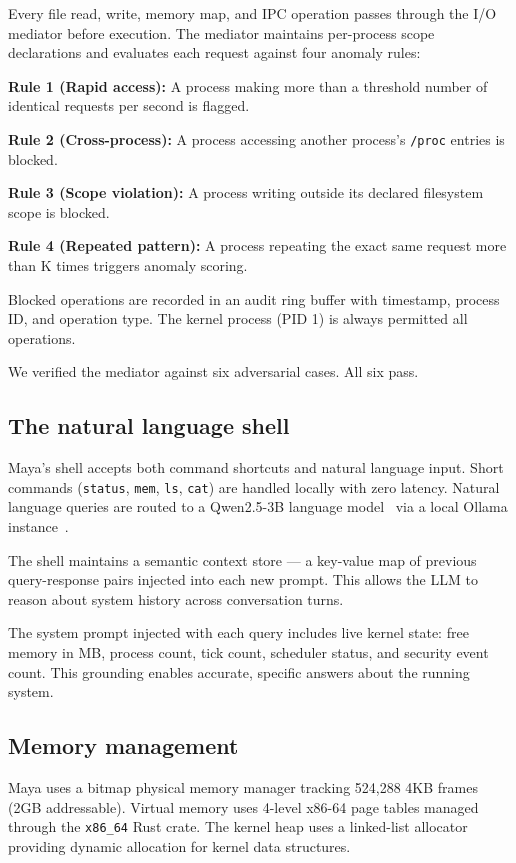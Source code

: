 \documentclass[letterpaper,twocolumn,10pt]{article}
\begin{document}
Every file read, write, memory map, and IPC
operation passes through the I/O mediator
before execution. The mediator maintains
per-process scope declarations and evaluates
each request against four anomaly rules:

\textbf{Rule 1 (Rapid access):} A process
making more than a threshold number of
identical requests per second is flagged.

\textbf{Rule 2 (Cross-process):} A process
accessing another process's \texttt{/proc}
entries is blocked.

\textbf{Rule 3 (Scope violation):} A process
writing outside its declared filesystem scope
is blocked.

\textbf{Rule 4 (Repeated pattern):} A process
repeating the exact same request more than K
times triggers anomaly scoring.

Blocked operations are recorded in an audit
ring buffer with timestamp, process ID, and
operation type. The kernel process (PID 1)
is always permitted all operations.

We verified the mediator against six adversarial
cases. All six pass.

\subsection{The natural language shell}

Maya's shell accepts both command shortcuts
and natural language input. Short commands
(\texttt{status}, \texttt{mem}, \texttt{ls},
\texttt{cat}) are handled locally with zero
latency. Natural language queries are routed
to a Qwen2.5-3B language model~\cite{qwen25}
via a local Ollama instance~\cite{ollama}.

The shell maintains a semantic context store
--- a key-value map of previous query-response
pairs injected into each new prompt. This
allows the LLM to reason about system history
across conversation turns.

The system prompt injected with each query
includes live kernel state: free memory in MB,
process count, tick count, scheduler status,
and security event count. This grounding
enables accurate, specific answers about the
running system.

\subsection{Memory management}

Maya uses a bitmap physical memory manager
tracking 524,288 4KB frames (2GB addressable).
Virtual memory uses 4-level x86-64 page tables
managed through the \texttt{x86\_64} Rust
crate. The kernel heap uses a linked-list
allocator providing dynamic allocation for
kernel data structures.
\end{document}
